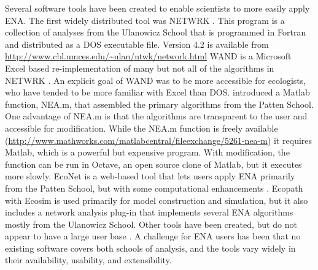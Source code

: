 \documentclass[11pt]{article}
\begin{document}
\begin{spacing}{2}
Several software tools have been created to enable scientists to more
easily apply ENA. The first widely distributed tool was NETWRK
\citep{ulanowicz91}.  This program is a collection of analyses from
the Ulanowicz School that is programmed in Fortran and distributed as
a DOS executable file. Version 4.2 is available from
\url{http://www.cbl.umces.edu/~ulan/ntwk/network.html}
WAND is a Microsoft Excel based re-implementation of many but not all
of the algorithms in NETWRK \citep{allesina04_wand}. An explicit goal
of WAND was to be more accessible for ecologists, who have tended to
be more familiar with Excel than DOS.  \citet{fath06} introduced a
Matlab function, NEA.m, that assembled the primary algorithms from the
Patten School.  One advantage of NEA.m is that the algorithms are
transparent to the user and accessible for modification.  While the
NEA.m function is freely available
(\url{http://www.mathworks.com/matlabcentral/fileexchange/5261-nea-m})
it requires Matlab, which is a powerful but expensive program.  With
modification, the function can be run in Octave, an open source clone
of Matlab, but it executes more slowly.  EcoNet is a web-based tool
that lets users apply ENA primarily from the Patten School, but with
some computational enhancements \citep{kazanci07, schramski11}.
Ecopath with Ecosim \citep{christensen92, christensen04} is used
primarily for model construction and simulation, but it also includes
a network analysis plug-in that implements several ENA algorithms
mostly from the Ulanowicz School.  Other tools have been created, but
do not appear to have a large user base \citep{latham2006,kones09}. A
challenge for ENA users has been that no existing software covers both
schools of analysis, and the tools vary widely in their availability,
usability, and extensibility.


\end{spacing}
\end{document}
